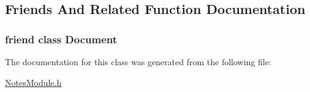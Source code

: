 \subsection{Friends And Related Function Documentation}
\hypertarget{class_notes_module_1_1_document_1_1_const_iterator_a883538034e58fc5c0de7d4e4cab3cef7}{
\subsubsection[{Document}]{\setlength{\rightskip}{0pt plus 5cm}friend class {\bf Document}\hspace{0.3cm}{\ttfamily [friend]}}}\label{class_notes_module_1_1_document_1_1_const_iterator_a883538034e58fc5c0de7d4e4cab3cef7}


The documentation for this class was generated from the following file\-:\begin{DoxyCompactItemize}
\item 
\hyperlink{_notes_module_8h}{Notes\-Module.\-h}\end{DoxyCompactItemize}
